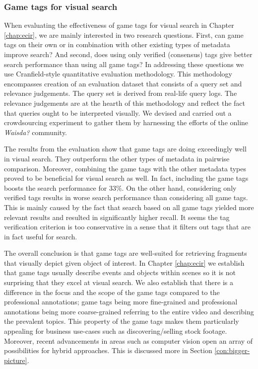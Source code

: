 \subsubsection{Game tags for visual search}
When evaluating the effectiveness of game tags for visual search in Chapter \ref{chap:ecir}, we are mainly interested in two research questions. First, can game tags on their own or in combination with other existing types of metadata improve search? And second, does using only verified (consensus) tags give better search performance than using all game tags? In addressing these questions we use Cranfield-style quantitative evaluation methodology. This methodology encompasses creation of an evaluation dataset that consists of a query set and relevance judgements. The query set is derived from real-life query logs. The relevance judgements are at the hearth of this methodology and reflect the fact that queries ought to be interpreted visually. We devised and carried out a crowdsourcing experiment to gather them by harnessing the efforts of the online \textit{Waisda?} community.

The results from the evaluation show that game tags are doing exceedingly well in visual search. They outperform  the other types of metadata in pairwise comparison. Moreover, combining the game tags with the other metadata types proved to be beneficial for visual search as well. In fact, including the game tags boosts the search performance for $33\%$. On the other hand, considering only verified tags results in worse search performance than considering all game tags. This is mainly caused by the fact that search based on all game tags yielded more relevant results and resulted in significantly higher recall. It seems the tag verification criterion is too conservative in a sense that it filters out tags that are in fact useful for search.

The overall conclusion is that game tags are well-suited for retrieving fragments that visually depict given object of interest. In Chapter \ref{chap:ecir} we establish that game tags usually describe events and objects within scenes so it is not surprising that they excel at visual search. We also establish that there is a difference in the focus and the scope of the game tags compared to the professional annotations; game tags being more fine-grained and professional annotations being more coarse-grained referring to the entire video and describing the prevalent topics. This property of the game tags makes them particularly appealing for business use-cases such as discovering/selling stock footage. Moreover, recent advancements in areas such as computer vision open an array of possibilities for hybrid approaches. This is discussed more in Section \ref{con:bigger-picture}.

